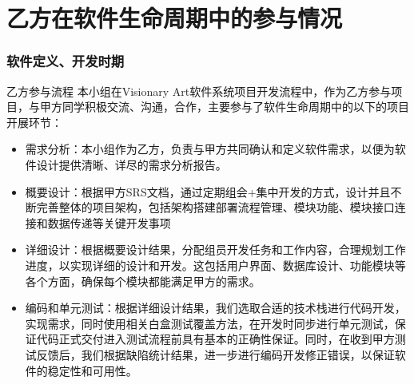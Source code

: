 \section{乙方在软件生命周期中的参与情况}
\begin{frame}
    \frametitle{软件定义、开发时期}
    \footnotesize
    \begin{block}{乙方参与流程}
    本小组在Visionary Art软件系统项目开发流程中，作为乙方参与项目，与甲方同学积极交流、沟通，合作，主要参与了软件生命周期中的以下的项目开展环节：
    \begin{itemize}
        \item 需求分析：本小组作为乙方，负责与甲方共同确认和定义软件需求，以便为软件设计提供清晰、详尽的需求分析报告。
        \item 概要设计：根据甲方SRS文档，通过定期组会+集中开发的方式，设计并且不断完善整体的项目架构，包括架构搭建部署流程管理、模块功能、模块接口连接和数据传递等关键开发事项
        \item 详细设计：根据概要设计结果，分配组员开发任务和工作内容，合理规划工作进度，以实现详细的设计和开发。这包括用户界面、数据库设计、功能模块等各个方面，确保每个模块都能满足甲方的需求。
        \item 编码和单元测试：根据详细设计结果，我们选取合适的技术栈进行代码开发，实现需求，同时使用相关白盒测试覆盖方法，在开发时同步进行单元测试，保证代码正式交付进入测试流程前具有基本的正确性保证。同时，在收到甲方测试反馈后，我们根据缺陷统计结果，进一步进行编码开发修正错误，以保证软件的稳定性和可用性。
    \end{itemize}
    \end{block}
\end{frame}





